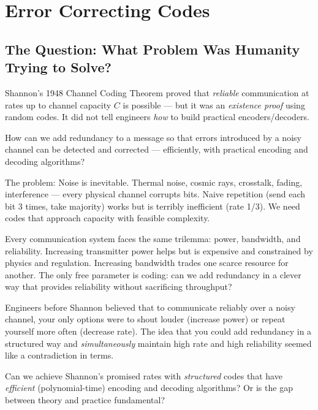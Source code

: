 
\chapter{Error Correcting Codes}
\label{ch:error_correction}

\section{The Question: What Problem Was Humanity Trying to Solve?}
\label{sec:ec:question}

Shannon's 1948 Channel Coding Theorem proved that \emph{reliable} communication at rates up to channel capacity $C$ is possible — but it was an \emph{existence proof} using random codes. It did not tell engineers \emph{how} to build practical encoders/decoders.

How can we add redundancy to a message so that errors introduced by a noisy channel can be detected and corrected — efficiently, with practical encoding and decoding algorithms?

The problem: Noise is inevitable. Thermal noise, cosmic rays, crosstalk, fading, interference — every physical channel corrupts bits. Naive repetition (send each bit 3 times, take majority) works but is terribly inefficient (rate 1/3). We need codes that approach capacity with feasible complexity.

Every communication system faces the same trilemma: power, bandwidth, and reliability. Increasing transmitter power helps but is expensive and constrained by physics and regulation. Increasing bandwidth trades one scarce resource for another. The only free parameter is coding: can we add redundancy in a clever way that provides reliability without sacrificing throughput?

Engineers before Shannon believed that to communicate reliably over a noisy channel, your only options were to shout louder (increase power) or repeat yourself more often (decrease rate). The idea that you could add redundancy in a structured way and \emph{simultaneously} maintain high rate and high reliability seemed like a contradiction in terms.

Can we achieve Shannon's promised rates with \emph{structured} codes that have \emph{efficient} (polynomial-time) encoding and decoding algorithms? Or is the gap between theory and practice fundamental?


